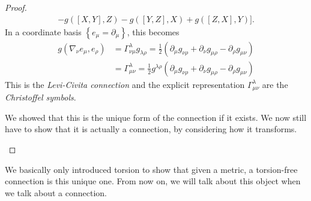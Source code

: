 \begin{proof}
\begin{multline}
    - g([X, Y], Z) - g([Y, Z], X) + g([Z, X], Y) \bigr].
  \end{multline}
  In a coordinate basis $\left\{ e_\mu = \partial_\mu \right\}$, this becomes
  \begin{align}
    g(\nabla_{\nu} e_\mu, e_\rho) &= \Gamma^\lambda_{\nu\mu} g_{\lambda\rho} = \frac{1}{2} (\partial_\mu g_{\nu\rho} + \partial_\nu g_{\mu\rho} - \partial_\rho g_{\mu\nu}) \\
				  &= \Gamma^\lambda_{\mu\nu} = \frac{1}{2} g^{\lambda\rho} (\partial_\mu g_{\nu\rho} + \partial_\nu g_{\mu\rho} - \partial_\rho g_{\mu\nu})
  \end{align}
  This is the \emph{Levi-Civita connection} and the explicit representation $\Gamma^\lambda_{\mu\nu}$ are the \emph{Christoffel symbols}.
  \begin{exercise}
    We showed that this is the unique form of the connection if it exists. We now still have to show that it is actually a connection, by considering how it transforms.
  \end{exercise}
\end{proof}

We basically only introduced torsion to show that given a metric, a torsion-free connection is this unique one.
From now on, we will talk about this object when we talk about a connection.

